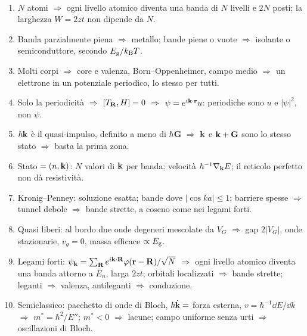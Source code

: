 \documentclass[11pt,a4paper]{article}
\begin{document}
\begin{riepilogo}\
\begin{enumerate}[itemsep=1pt]
\item $N$ atomi $\Rightarrow$ ogni livello atomico diventa una banda di $N$ livelli e $2N$ posti; la larghezza $W=2zt$ non dipende da $N$.
\item Banda parzialmente piena $\Rightarrow$ metallo; bande piene o vuote $\Rightarrow$ isolante o semiconduttore, secondo $E_{\mathrm g}/k_{\mathrm B} T$.
\item Molti corpi $\Rightarrow$ core e valenza, Born--Oppenheimer, campo medio $\Rightarrow$ un elettrone in un potenziale periodico, lo stesso per tutti.
\item Solo la periodicità $\Rightarrow$ $[T_{\mathbf R},H]=0$ $\Rightarrow$ $\psi=e^{i\mathbf k\cdot\mathbf r}u$: periodiche sono $u$ e $|\psi|^2$, non $\psi$.
\item $\hbar\mathbf k$ è il quasi-impulso, definito a meno di $\hbar\mathbf G$ $\Rightarrow$ $\mathbf k$ e $\mathbf k+\mathbf G$ sono lo stesso stato $\Rightarrow$ basta la prima zona.
\item Stato $=(n,\mathbf k)$: $N$ valori di $\mathbf k$ per banda; velocità $\hbar^{-1}\nabla_{\mathbf k}E$; il reticolo perfetto non dà resistività.
\item Kronig--Penney: soluzione esatta; bande dove $|\cos ka|\le1$; barriere spesse $\Rightarrow$ tunnel debole $\Rightarrow$ bande strette, a coseno come nei legami forti.
\item Quasi liberi: al bordo due onde degeneri mescolate da $V_G$ $\Rightarrow$ gap $2|V_G|$, onde stazionarie, $v_g=0$, massa efficace $\propto E_{\mathrm g}$.
\item Legami forti: $\psi_{\mathbf k}=\sum_{\mathbf R}e^{i\mathbf k\cdot\mathbf R}\varphi(\mathbf r-\mathbf R)/\sqrt N$ $\Rightarrow$ ogni livello atomico diventa una banda attorno a $\bar E_n$, larga $2zt$;
orbitali localizzati $\Rightarrow$ bande strette; leganti $\Rightarrow$ valenza, antileganti $\Rightarrow$ conduzione.
\item Semiclassico: pacchetto di onde di Bloch, $\hbar\dot{\mathbf k}=$ forza esterna, $v=\hbar^{-1}\dd E/\dd k$ $\Rightarrow$ $m^*=\hbar^2/E''$; $m^*<0$ $\Rightarrow$ lacune;
campo uniforme senza urti $\Rightarrow$ oscillazioni di Bloch.
\end{enumerate}
\end{riepilogo}
\end{document}
